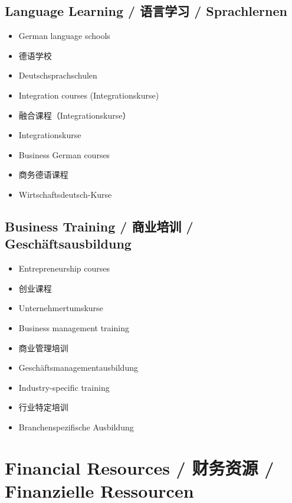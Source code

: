 \subsection{Language Learning / 语言学习 / Sprachlernen}
\begin{itemize}
    \item German language schools
    \item 德语学校
    \item Deutschsprachschulen
    \item Integration courses (Integrationskurse)
    \item 融合课程（Integrationskurse）
    \item Integrationskurse
    \item Business German courses
    \item 商务德语课程
    \item Wirtschaftsdeutsch-Kurse
\end{itemize}

\subsection{Business Training / 商业培训 / Geschäftsausbildung}
\begin{itemize}
    \item Entrepreneurship courses
    \item 创业课程
    \item Unternehmertumskurse
    \item Business management training
    \item 商业管理培训
    \item Geschäftsmanagementausbildung
    \item Industry-specific training
    \item 行业特定培训
    \item Branchenspezifische Ausbildung
\end{itemize}

\section{Financial Resources / 财务资源 / Finanzielle Ressourcen}

